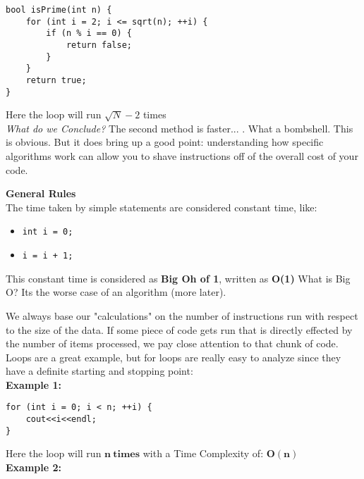 \begin{verbatim}
bool isPrime(int n) {
    for (int i = 2; i <= sqrt(n); ++i) {
        if (n % i == 0) {
            return false;
        }
    }
    return true;
}
\end{verbatim}

Here the loop will run $\sqrt{N}-2$ times\\

\textit{What do we Conclude?} The second method is faster... \faBomb. What a bombshell. This is obvious. But it does bring up a good point: understanding how specific algorithms work can allow you to shave instructions off of the overall cost of your code.


\textbf{General Rules}\\

The time taken by simple statements are considered constant time, like:

\begin{itemize}
	\tightlist
	\item
	      \texttt{int\ i\ =\ 0;}
	\item
	      \texttt{i\ =\ i\ +\ 1;}
\end{itemize}

This constant time is considered as \textbf{Big Oh of 1}, written as \textbf{O(1)} What is Big O? Its the worse case of an algorithm (more later).\\


We always base our "calculations" on the number of instructions run with respect to the size of the data. If some piece of code gets run that is directly effected by the number of items processed, we pay close attention to that chunk of code. Loops are a great example, but for loops are really easy to analyze since they have a definite starting and stopping point:\\

\textbf{Example 1:}\\

\begin{verbatim}
for (int i = 0; i < n; ++i) {
	cout<<i<<endl;
}
\end{verbatim}

Here the loop will run $\mathbf{n\: times}$ with a Time Complexity of: $\mathbf{O(n)}$\\

\textbf{Example 2:}\\

